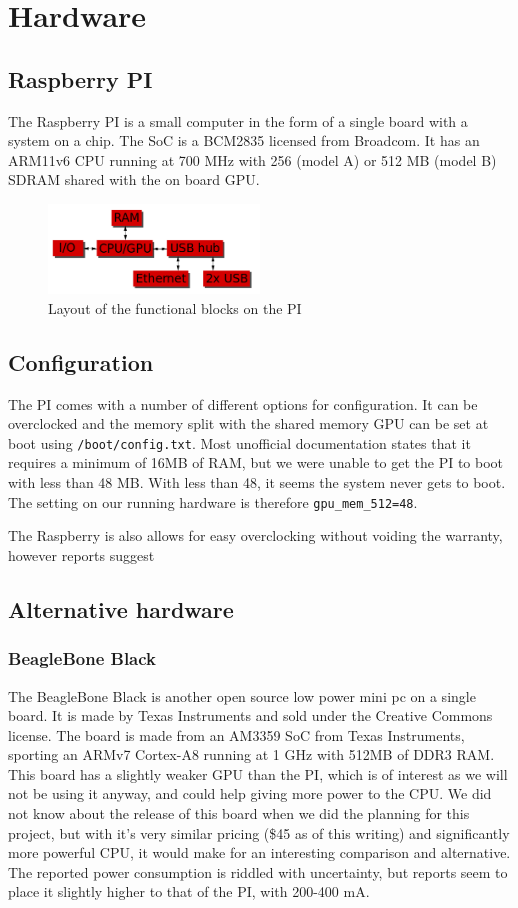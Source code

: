 \clearpage
\section{Hardware}
\subsection{Raspberry PI}
The Raspberry PI is a small computer in the form of a single board with a system on a chip. The SoC is a BCM2835 licensed from Broadcom. It has an ARM11v6 CPU running at 700 MHz with 256 (model A) or 512 MB (model B) SDRAM shared with the on board GPU.
\begin{figure}[h]
    \includegraphics[width=0.5\textwidth]{hardware/raspberrypi_block_function}
    \caption{Layout of the functional blocks on the PI}
    \label{fig:pi_blockdiagram}
\end{figure}
\subsection{Configuration}
The PI comes with a number of different options for configuration. It can be overclocked and the memory split with the shared memory GPU can be set at boot using {\tt /boot/config.txt}.
Most unofficial documentation states that it requires a minimum of 16MB of RAM, but we were unable to get the PI to boot with less than 48 MB. With less than 48, it seems the system never gets to boot.
The setting on our running hardware is therefore {\tt gpu\_mem\_512=48}.

The Raspberry is also allows for easy overclocking without voiding the warranty, however reports suggest
\subsection{Alternative hardware}
\subsubsection{BeagleBone Black}
The BeagleBone Black is another open source low power mini pc on a single board. It is made by Texas Instruments and sold under the Creative Commons license.
The board is made from an AM3359 SoC from Texas Instruments, sporting an ARMv7 Cortex-A8 running at 1 GHz with 512MB of DDR3 RAM. This board has a slightly weaker GPU than the PI, which is of interest as we will not be using it anyway, and could help giving more power to the CPU.
We did not know about the release of this board when we did the planning for this project, but with it's very similar pricing (\$45 as of this writing) and significantly more powerful CPU, it would make for an interesting comparison and alternative. The reported power consumption is riddled with uncertainty, but reports seem to place it slightly higher to that of the PI, with 200-400 mA.

